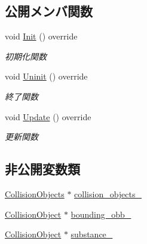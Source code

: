 \subsection*{公開メンバ関数}
\begin{DoxyCompactItemize}
\item 
void \mbox{\hyperlink{class_coin_collision_a4119a7decab2410a4ada3568ad0c132d}{Init}} () override
\begin{DoxyCompactList}\small\item\em 初期化関数 \end{DoxyCompactList}\item 
void \mbox{\hyperlink{class_coin_collision_aa852afdcdbedcf82809df9c7fd99be9e}{Uninit}} () override
\begin{DoxyCompactList}\small\item\em 終了関数 \end{DoxyCompactList}\item 
void \mbox{\hyperlink{class_coin_collision_a981fd9b1b8c688a757a456a56d80501b}{Update}} () override
\begin{DoxyCompactList}\small\item\em 更新関数 \end{DoxyCompactList}\end{DoxyCompactItemize}
\subsection*{非公開変数類}
\begin{DoxyCompactItemize}
\item 
\mbox{\hyperlink{class_collision_objects}{Collision\+Objects}} $\ast$ \mbox{\hyperlink{class_coin_collision_a6a110ab9ad9acd6942a5725380443151}{collision\+\_\+objects\+\_\+}}
\item 
\mbox{\hyperlink{class_collision_object}{Collision\+Object}} $\ast$ \mbox{\hyperlink{class_coin_collision_ac604781e9ab6194c06bf9ca7f426bd95}{bounding\+\_\+obb\+\_\+}}
\item 
\mbox{\hyperlink{class_collision_object}{Collision\+Object}} $\ast$ \mbox{\hyperlink{class_coin_collision_a255c792770274eebf85df921467e6f1c}{substance\+\_\+}}
\end{DoxyCompactItemize}
